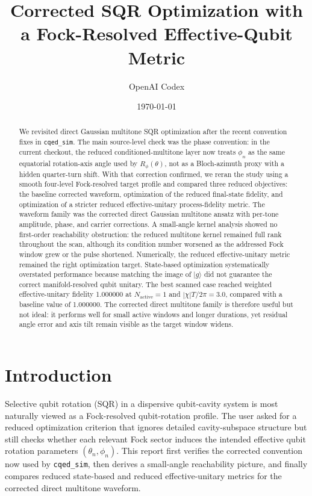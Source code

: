 \documentclass[aps,pra,twocolumn,reprint,amsmath,amssymb]{revtex4-2}
\begin{document}
\title{Corrected SQR Optimization with a Fock-Resolved Effective-Qubit Metric}
\author{OpenAI Codex}
\date{\today}

\begin{abstract}
We revisited direct Gaussian multitone SQR optimization after the recent convention fixes in \texttt{cqed\_sim}. The main source-level check was the phase convention: in the current checkout, the reduced conditioned-multitone layer now treats $\phi_n$ as the same equatorial rotation-axis angle used by $R_\phi(\theta)$, not as a Bloch-azimuth proxy with a hidden quarter-turn shift. With that correction confirmed, we reran the study using a smooth four-level Fock-resolved target profile and compared three reduced objectives: the baseline corrected waveform, optimization of the reduced final-state fidelity, and optimization of a stricter reduced effective-unitary process-fidelity metric. The waveform family was the corrected direct Gaussian multitone ansatz with per-tone amplitude, phase, and carrier corrections. A small-angle kernel analysis showed no first-order reachability obstruction: the reduced multitone kernel remained full rank throughout the scan, although its condition number worsened as the addressed Fock window grew or the pulse shortened. Numerically, the reduced effective-unitary metric remained the right optimization target. State-based optimization systematically overstated performance because matching the image of $|g\rangle$ did not guarantee the correct manifold-resolved qubit unitary. The best scanned case reached weighted effective-unitary fidelity 1.000000 at $N_{\mathrm{active}}=1$ and $|\chi|T/2\pi=3.0$, compared with a baseline value of 1.000000. The corrected direct multitone family is therefore useful but not ideal: it performs well for small active windows and longer durations, yet residual angle error and axis tilt remain visible as the target window widens.
\end{abstract}

\maketitle

\section{Introduction}
Selective qubit rotation (SQR) in a dispersive qubit-cavity system is most naturally viewed as a Fock-resolved qubit-rotation profile. The user asked for a reduced optimization criterion that ignores detailed cavity-subspace structure but still checks whether each relevant Fock sector induces the intended effective qubit rotation parameters $(\theta_n,\phi_n)$. This report first verifies the corrected convention now used by \texttt{cqed\_sim}, then derives a small-angle reachability picture, and finally compares reduced state-based and reduced effective-unitary metrics for the corrected direct multitone waveform.
\end{document}
